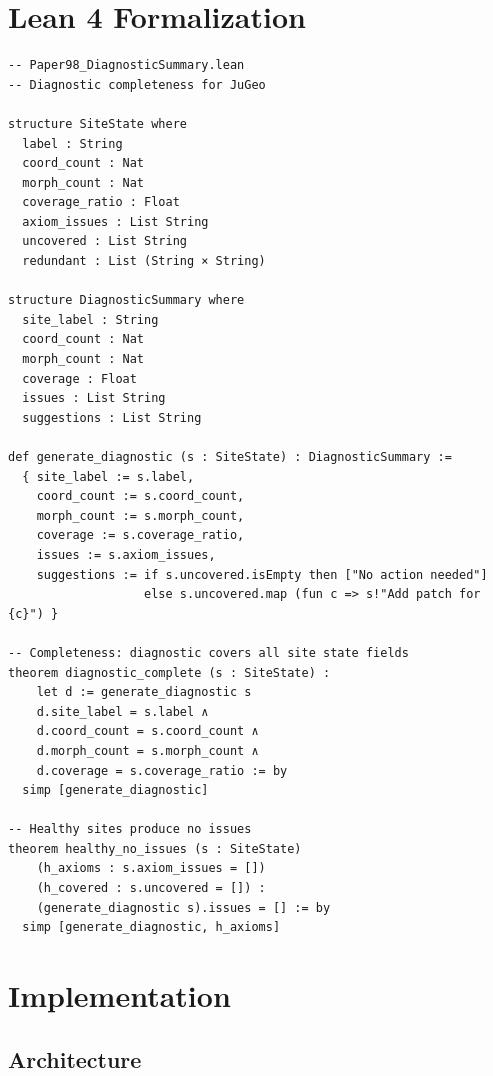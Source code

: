 \documentclass[11pt]{article}
\begin{document}
\section{Lean 4 Formalization}\label{sec:lean}

\begin{lstlisting}[style=jugeo-python,title=Lean 4 Formalization Sketch]
-- Paper98_DiagnosticSummary.lean
-- Diagnostic completeness for JuGeo

structure SiteState where
  label : String
  coord_count : Nat
  morph_count : Nat
  coverage_ratio : Float
  axiom_issues : List String
  uncovered : List String
  redundant : List (String × String)

structure DiagnosticSummary where
  site_label : String
  coord_count : Nat
  morph_count : Nat
  coverage : Float
  issues : List String
  suggestions : List String

def generate_diagnostic (s : SiteState) : DiagnosticSummary :=
  { site_label := s.label,
    coord_count := s.coord_count,
    morph_count := s.morph_count,
    coverage := s.coverage_ratio,
    issues := s.axiom_issues,
    suggestions := if s.uncovered.isEmpty then ["No action needed"]
                   else s.uncovered.map (fun c => s!"Add patch for {c}") }

-- Completeness: diagnostic covers all site state fields
theorem diagnostic_complete (s : SiteState) :
    let d := generate_diagnostic s
    d.site_label = s.label ∧
    d.coord_count = s.coord_count ∧
    d.morph_count = s.morph_count ∧
    d.coverage = s.coverage_ratio := by
  simp [generate_diagnostic]

-- Healthy sites produce no issues
theorem healthy_no_issues (s : SiteState)
    (h_axioms : s.axiom_issues = [])
    (h_covered : s.uncovered = []) :
    (generate_diagnostic s).issues = [] := by
  simp [generate_diagnostic, h_axioms]
\end{lstlisting}

\section{Implementation}\label{sec:impl}

\subsection{Architecture}
\end{document}
